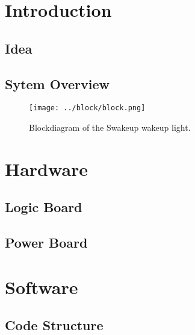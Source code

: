 \documentclass{report}
\begin{document}


\chapter{Introduction}
\label{chap:intro}
\section{Idea}
\label{sec:idea}
\section{Sytem Overview}
\label{sec:system}
\begin{figure}[H]
	\centering
	\label{fig:block}
	\texttt{[image: ../block/block.png]}
	\caption{Blockdiagram of the Swakeup wakeup light.}
\end{figure}

\chapter{Hardware}
\label{chap:hardware}
\section{Logic Board}
\label{sec:logic}

\section{Power Board}
\label{sec:power}


\chapter{Software}
\label{chap:software}
\section{Code Structure}
\label{sec:code_structure}

\end{document}
